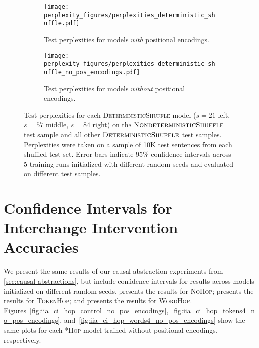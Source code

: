 \documentclass[11pt]{article}
\begin{document}
\begin{figure*}[ht]
    \centering
     \begin{subfigure}{1\textwidth}
         \centering
         \texttt{[image: perplexity\_figures/perplexities\_deterministic\_shuffle.pdf]}
         \caption{Test perplexities for models \emph{with} positional encodings.}
     \end{subfigure}
     
     \begin{subfigure}{1\textwidth}
         \centering
         \texttt{[image: perplexity\_figures/perplexities\_deterministic\_shuffle\_no\_pos\_encodings.pdf]}
         \caption{Test perplexities for models \emph{without} positional encodings.}
     \end{subfigure}
    \caption{Test perplexities for each \textsc{DeterministicShuffle} model ($s=21$ left, $s=57$ middle, $s=84$ right) on the $\textsc{NondeterministicShuffle}$ test sample and all other $\textsc{DeterministicShuffle}$ test samples. Perplexities were taken on a sample of 10K test sentences from each shuffled test set. Error bars indicate 95\% confidence intervals across 5 training runs initialized with different random seeds and evaluated on different test samples.}
    \label{fig:perplexities-deterministic-shuffle}
\end{figure*}


\section{Confidence Intervals for Interchange Intervention Accuracies} \label{sec:intervention_confidence_intervals}

We present the same results of our causal abstraction experiments from \cref{sec:causal-abstractions}, but include confidence intervals for results across models initialized on different random seeds.  presents the results for \textsc{NoHop};  presents the results for \textsc{TokenHop}; and  presents the results for \textsc{WordHop}. Figures~\ref{fig:iia_ci_hop_control_no_pos_encodings},~\ref{fig:iia_ci_hop_tokens4_no_pos_encodings}, and~\ref{fig:iia_ci_hop_words4_no_pos_encodings} show the same plots for each \textsc{*Hop} model trained without positional encodings, respectively.
\end{document}
